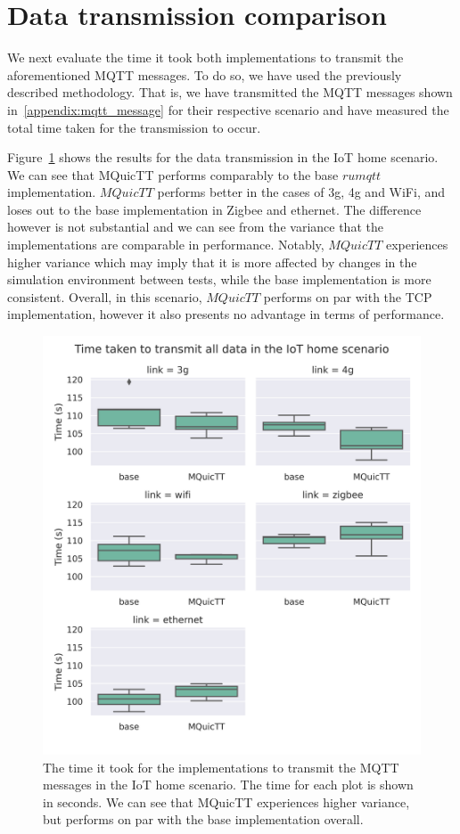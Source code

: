 \section{Data transmission comparison}

We next evaluate the time it took both implementations to transmit the aforementioned MQTT messages.
To do so, we have used the previously described methodology.
That is, we have transmitted the MQTT messages shown in~\ref{appendix:mqtt_message} for their respective scenario and have measured the total time taken for the transmission to occur.

Figure~\ref{fig:comm_time_home} shows the results for the data transmission in the IoT home scenario.
We can see that MQuicTT performs comparably to the base $rumqtt$ implementation.
$MQuicTT$ performs better in the cases of 3g, 4g and WiFi, and loses out to the base implementation in Zigbee and ethernet.
The difference however is not substantial and we can see from the variance that the implementations are comparable in performance.
Notably, $MQuicTT$ experiences higher variance which may imply that it is more affected by changes in the simulation environment between tests, while the base implementation is more consistent.
Overall, in this scenario, $MQuicTT$ performs on par with the TCP implementation, however it also presents no advantage in terms of performance.

\begin{figure}
    \centering
    \includegraphics[width=1\linewidth]{images/analysis_comm_time_home.png}
    \caption{The time it took for the implementations to transmit the MQTT messages in the IoT home scenario.
        The time for each plot   is shown in seconds.
        We can see that MQuicTT experiences higher variance, but performs on par with the base implementation overall.}
    \label{fig:comm_time_home}
\end{figure}

